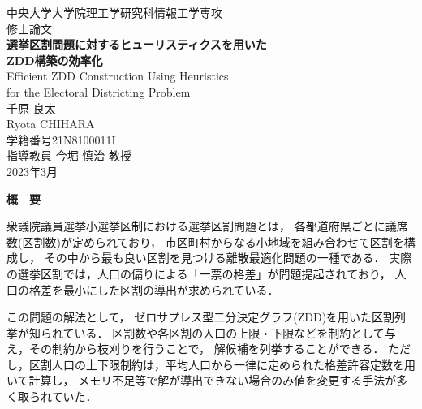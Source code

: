 ﻿\documentclass[a4j,12pt]{jreport}
\begin{document}
\thispagestyle{empty}
\begin{center}
\begin{Large}
\vspace*{0.7cm}
{\large 中央大学大学院理工学研究科情報工学専攻\\修士論文}\\
\vspace*{2.3cm}
{\bf 選挙区割問題に対するヒューリスティクスを用いた\\ZDD構築の効率化}\\
\vspace*{0.7cm}
{\sf Efficient ZDD Construction Using Heuristics \\for the Electoral Districting Problem}\\
\vspace*{5cm}
千原 良太\\
Ryota CHIHARA\\
学籍番号\hspace*{1zw}21N8100011I\\
\vspace*{2.5cm}
指導教員\hspace*{1zw} 今堀 慎治 教授\\
\vspace*{2.5cm}
2023年3月\\
\end{Large}
\end{center}


\newpage
\renewcommand{\baselinestretch}{1.25} \selectfont
{}


\begin{center} {\large \bf{概　要}} \end{center}

衆議院議員選挙小選挙区制における選挙区割問題とは，
各都道府県ごとに議席数(区割数)が定められており，
市区町村からなる小地域を組み合わせて区割を構成し，
その中から最も良い区割を見つける離散最適化問題の一種である．
実際の選挙区割では，人口の偏りによる「一票の格差」が問題提起されており，
人口の格差を最小にした区割の導出が求められている．

この問題の解法として，
ゼロサプレス型二分決定グラフ(ZDD)を用いた区割列挙が知られている．
区割数や各区割の人口の上限・下限などを制約として与え，その制約から枝刈りを行うことで，
解候補を列挙することができる．
ただし，区割人口の上下限制約は，平均人口から一律に定められた格差許容定数を用いて計算し，
メモリ不足等で解が導出できない場合のみ値を変更する手法が多く取られていた．
\end{document}
